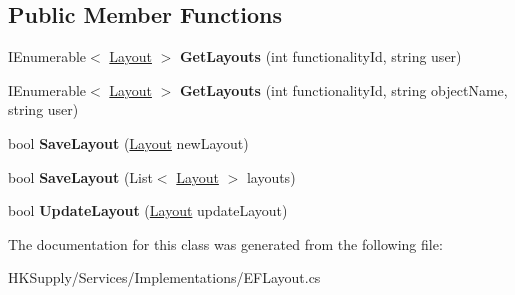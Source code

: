 \subsection*{Public Member Functions}
\begin{DoxyCompactItemize}
\item 
\mbox{\label{class_h_k_supply_1_1_services_1_1_implementations_1_1_e_f_layout_a07d91cea5164b984ff538c830980dad1}} 
I\+Enumerable$<$ \mbox{\hyperlink{class_h_k_supply_1_1_models_1_1_layout}{Layout}} $>$ {\bfseries Get\+Layouts} (int functionality\+Id, string user)
\item 
\mbox{\label{class_h_k_supply_1_1_services_1_1_implementations_1_1_e_f_layout_a36f49bec7f019186d7f51135da2b5c68}} 
I\+Enumerable$<$ \mbox{\hyperlink{class_h_k_supply_1_1_models_1_1_layout}{Layout}} $>$ {\bfseries Get\+Layouts} (int functionality\+Id, string object\+Name, string user)
\item 
\mbox{\label{class_h_k_supply_1_1_services_1_1_implementations_1_1_e_f_layout_a2a6caa6d5c642a3999ff838d8bc9abdb}} 
bool {\bfseries Save\+Layout} (\mbox{\hyperlink{class_h_k_supply_1_1_models_1_1_layout}{Layout}} new\+Layout)
\item 
\mbox{\label{class_h_k_supply_1_1_services_1_1_implementations_1_1_e_f_layout_a6d402c97ed65fe6d6148541832abeb3a}} 
bool {\bfseries Save\+Layout} (List$<$ \mbox{\hyperlink{class_h_k_supply_1_1_models_1_1_layout}{Layout}} $>$ layouts)
\item 
\mbox{\label{class_h_k_supply_1_1_services_1_1_implementations_1_1_e_f_layout_ac7e895cd7c46794220b498f89328fee0}} 
bool {\bfseries Update\+Layout} (\mbox{\hyperlink{class_h_k_supply_1_1_models_1_1_layout}{Layout}} update\+Layout)
\end{DoxyCompactItemize}


The documentation for this class was generated from the following file\+:\begin{DoxyCompactItemize}
\item 
H\+K\+Supply/\+Services/\+Implementations/E\+F\+Layout.\+cs\end{DoxyCompactItemize}
